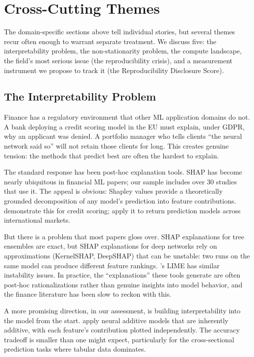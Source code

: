 \section{Cross-Cutting Themes}\label{sec:cross_cutting}

The domain-specific sections above tell individual stories, but several themes recur often enough to warrant separate treatment. We discuss five: the interpretability problem, the non-stationarity problem, the compute landscape, the field's most serious issue (the reproducibility crisis), and a measurement instrument we propose to track it (the Reproducibility Disclosure Score).

\subsection{The Interpretability Problem}

Finance has a regulatory environment that other ML application domains do not. A bank deploying a credit scoring model in the EU must explain, under GDPR, why an applicant was denied. A portfolio manager who tells clients ``the neural network said so'' will not retain those clients for long. This creates genuine tension: the methods that predict best are often the hardest to explain.

The standard response has been post-hoc explanation tools. SHAP \citep{Lundberg2017} has become nearly ubiquitous in financial ML papers; our sample includes over 30 studies that use it. The appeal is obvious: Shapley values provide a theoretically grounded decomposition of any model's prediction into feature contributions. \citet{Bussmann2021} demonstrate this for credit scoring; \citet{Leippold2022} apply it to return prediction models across international markets.

But there is a problem that most papers gloss over. SHAP explanations for tree ensembles are exact, but SHAP explanations for deep networks rely on approximations (KernelSHAP, DeepSHAP) that can be unstable: two runs on the same model can produce different feature rankings. \citet{Ribeiro2016}'s LIME has similar instability issues. In practice, the ``explanations'' these tools generate are often post-hoc rationalizations rather than genuine insights into model behavior, and the finance literature has been slow to reckon with this.

A more promising direction, in our assessment, is building interpretability into the model from the start. \citet{Chang2021} apply neural additive models that are inherently additive, with each feature's contribution plotted independently. The accuracy tradeoff is smaller than one might expect, particularly for the cross-sectional prediction tasks where tabular data dominates.

